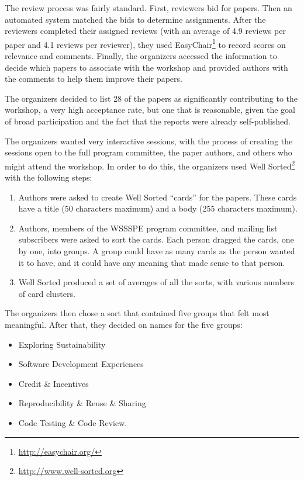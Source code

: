 \documentclass[11pt, oneside]{amsart}
\begin{document}
The review process was fairly standard. First, reviewers bid for papers. Then an
automated system matched the bids to determine assignments. After the reviewers
completed their assigned reviews (with an average of 4.9 reviews per paper and
4.1 reviews per reviewer), they used EasyChair\footnote{\url{http://easychair.org/}} 
to record scores on relevance
and comments. Finally, the organizers accessed the information to decide which
papers to associate with the workshop and provided authors with the comments to
help them improve their papers.

The organizers decided to list 28 of the papers as significantly contributing to
the workshop, a very high acceptance rate, but one that is reasonable, given the
goal of broad participation and the fact that the reports were already
self-published.

The organizers wanted very interactive sessions, with the process of creating
the sessions open to the full program committee, the paper authors, and others
who might attend the workshop. In order to do this, the organizers used 
Well Sorted\footnote{\url{http://www.well-sorted.org}} with the following steps:
\begin{enumerate}
%
\item Authors were asked to create Well Sorted ``cards'' for the papers. These
cards have a title (50 characters maximum) and a body (255 characters maximum).
%
\item Authors, members of the WSSSPE program committee, and mailing list subscribers
were asked to sort the cards. Each person dragged the cards, one by one, into
groups. A group could have as many cards as the person wanted it to have, and it
could have any meaning that made sense to that person.
%
\item Well Sorted produced a set of averages of all the sorts, with
various numbers of card clusters.
%
\end{enumerate}

The organizers then chose a sort that contained five groups that felt most
meaningful. After that, they decided on names for the five groups:
\begin{itemize}
\item Exploring Sustainability
\item Software Development Experiences
\item Credit \& Incentives
\item Reproducibility \& Reuse \& Sharing
\item Code Testing \& Code Review.
\end{itemize}
\end{document}
